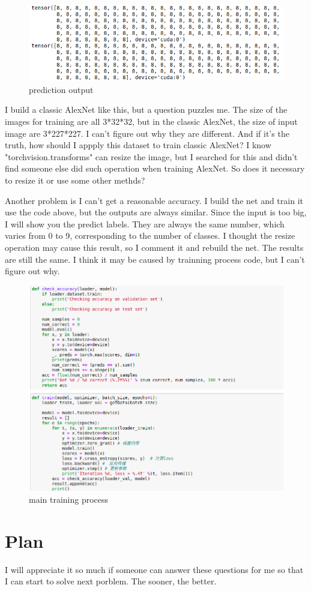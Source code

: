 \documentclass{article} %
\begin{document}
\begin{figure}[ht]
	\centering
	\includegraphics[width=1\textwidth]{2.png}
	\caption{prediction output}
	\label{fig:f2}
\end{figure}


I build a classic AlexNet like this, but a question puzzles me. The size of the images for training are all 3*32*32, but in the classic AlexNet, the size of input image are 3*227*227. I can't figure out why they are different. And if it's the truth, how should I appply this dataset to train classic AlexNet? I know "torchvision.transforms" can resize the image, but I searched for this and didn't find someone else did such operation when training AlexNet. So does it necessary to resize it or use some other methds?

Another problem is I can't get a reasonable accuracy. I build the net and train it use the code above, but the outputs are always similar. Since the input is too big, I will show you the predict labels. They are always the same number, which varies from 0 to 9, corresponding to the number of classes. I thought the resize operation may cause this result, so I comment it and rebuild the net. The results are still the same. I think it may be caused by trainning process code, but I can't figure out why.

\begin{figure}[ht]
	\centering
	\includegraphics[width=1\textwidth]{3.png}
	\caption{main training process}
	\label{fig:f3}
\end{figure}

\section{Plan}
I will appreciate it so much if someone can answer these questions for me so that I can start to solve next porblem. The sooner, the better.
\end{document}
